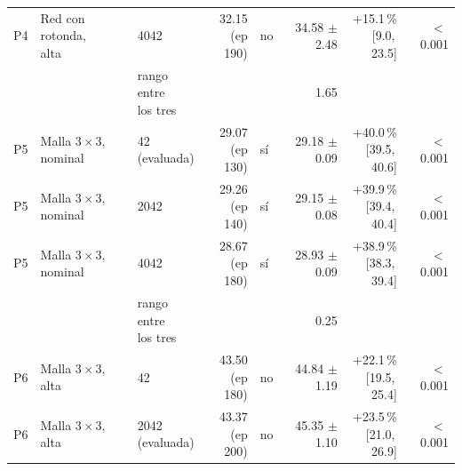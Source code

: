 \begin{table}[H]
\begin{tabular}{lllrlrrr}
P4 & \makecell[l]{Red con rotonda,\\{}alta} & 4042 & \makecell[r]{32.15\\{}(ep 190)} & no & \makecell[r]{34.58\\{}$\pm$ 2.48} & \makecell[r]{+15.1\,\%\\{}[9.0,\,23.5]} & $<$\,0.001 \\
 & & \makecell[l]{rango entre\\{}los tres} & & & 1.65 & & \\
P5 & \makecell[l]{Malla $3 \times 3$,\\{}nominal} & \makecell[l]{42\\{}(evaluada)} & \makecell[r]{29.07\\{}(ep 130)} & sí & \makecell[r]{29.18\\{}$\pm$ 0.09} & \makecell[r]{+40.0\,\%\\{}[39.5,\,40.6]} & $<$\,0.001 \\
P5 & \makecell[l]{Malla $3 \times 3$,\\{}nominal} & 2042 & \makecell[r]{29.26\\{}(ep 140)} & sí & \makecell[r]{29.15\\{}$\pm$ 0.08} & \makecell[r]{+39.9\,\%\\{}[39.4,\,40.4]} & $<$\,0.001 \\
P5 & \makecell[l]{Malla $3 \times 3$,\\{}nominal} & 4042 & \makecell[r]{28.67\\{}(ep 180)} & sí & \makecell[r]{28.93\\{}$\pm$ 0.09} & \makecell[r]{+38.9\,\%\\{}[38.3,\,39.4]} & $<$\,0.001 \\
 & & \makecell[l]{rango entre\\{}los tres} & & & 0.25 & & \\
P6 & \makecell[l]{Malla $3 \times 3$,\\{}alta} & 42 & \makecell[r]{43.50\\{}(ep 180)} & no & \makecell[r]{44.84\\{}$\pm$ 1.19} & \makecell[r]{+22.1\,\%\\{}[19.5,\,25.4]} & $<$\,0.001 \\
P6 & \makecell[l]{Malla $3 \times 3$,\\{}alta} & \makecell[l]{2042\\{}(evaluada)} & \makecell[r]{43.37\\{}(ep 200)} & no & \makecell[r]{45.35\\{}$\pm$ 1.10} & \makecell[r]{+23.5\,\%\\{}[21.0,\,26.9]} & $<$\,0.001 \\

\end{tabular}
\end{table}
